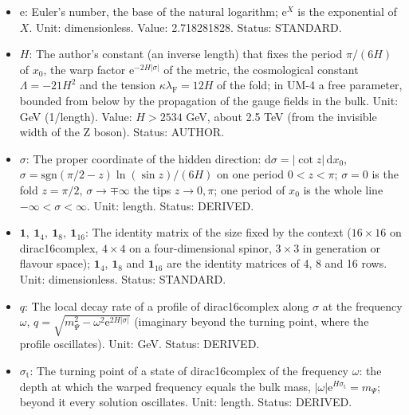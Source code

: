 \documentclass[
  10pt,
]{article}
\begin{document}
\begin{itemize}
\item
  \(\mathrm{e}\): Euler's number, the base of the natural logarithm;
  \(\mathrm{e}^{X}\) is the exponential of \(X\). Unit: dimensionless.
  Value: 2.718281828. Status: STANDARD.
\item
  \(H\): The author's constant (an inverse length) that fixes the period
  \(\pi/(6H)\) of \(x_0\), the warp factor
  \(\mathrm{e}^{-2H\lvert\sigma\rvert}\) of the metric, the cosmological
  constant \(\Lambda = -21H^2\) and the tension
  \(\kappa\lambda_{\mathrm{F}} = 12H\) of the fold; in UM-4 a free
  parameter, bounded from below by the propagation of the gauge fields
  in the bulk. Unit: GeV (1/length). Value: \(H > 2534\) GeV, about 2.5
  TeV (from the invisible width of the Z boson). Status: AUTHOR.
\item
  \(\sigma\): The proper coordinate of the hidden direction:
  \(\mathrm{d}\sigma = \lvert\cot z\rvert\,\mathrm{d}x_0\),
  \(\sigma = \mathrm{sgn}(\pi/2 - z)\ln(\sin z)/(6H)\) on one period
  \(0 < z < \pi\); \(\sigma = 0\) is the fold \(z = \pi/2\),
  \(\sigma \to \mp\infty\) the tips \(z \to 0, \pi\); one period of
  \(x_0\) is the whole line \(-\infty < \sigma < \infty\). Unit: length.
  Status: DERIVED.
\item
  \(\mathbf{1},\ \mathbf{1}_4,\ \mathbf{1}_8,\ \mathbf{1}_{16}\): The
  identity matrix of the size fixed by the context (\(16 \times 16\) on
  dirac16complex, \(4 \times 4\) on a four-dimensional spinor,
  \(3 \times 3\) in generation or flavour space); \(\mathbf{1}_4\),
  \(\mathbf{1}_8\) and \(\mathbf{1}_{16}\) are the identity matrices of
  4, 8 and 16 rows. Unit: dimensionless. Status: STANDARD.
\item
  \(q\): The local decay rate of a profile of dirac16complex along
  \(\sigma\) at the frequency \(\omega\),
  \(q = \sqrt{m_\Psi^2 - \omega^2\mathrm{e}^{2H\lvert\sigma\rvert}}\)
  (imaginary beyond the turning point, where the profile oscillates).
  Unit: GeV. Status: DERIVED.
\item
  \(\sigma_{\mathrm{t}}\): The turning point of a state of
  dirac16complex of the frequency \(\omega\): the depth at which the
  warped frequency equals the bulk mass,
  \(\lvert\omega\rvert\mathrm{e}^{H\sigma_{\mathrm{t}}} = m_\Psi\);
  beyond it every solution oscillates. Unit: length. Status: DERIVED.
\end{itemize}
\end{document}
